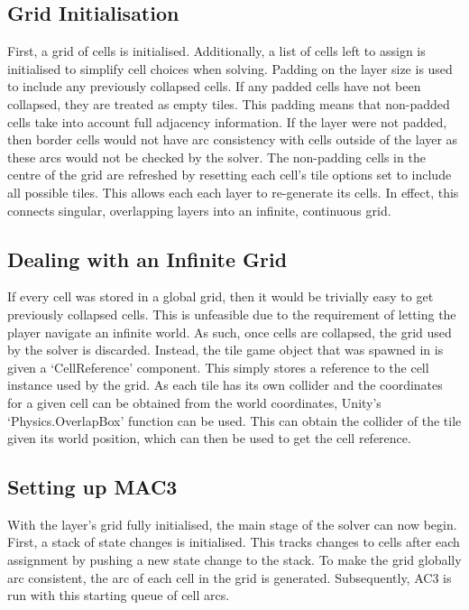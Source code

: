 \subsection{Grid Initialisation}
First, a grid of cells is initialised. Additionally, a list of cells left to assign is initialised to simplify cell choices when solving. Padding on the layer size is used to include any previously collapsed cells. If any padded cells have not been collapsed, they are treated as empty tiles. This padding means that non-padded cells take into account full adjacency information. If the layer were not padded, then border cells would not have arc consistency with cells outside of the layer as these arcs would not be checked by the solver. The non-padding cells in the centre of the grid are refreshed by resetting each cell's tile options set to include all possible tiles. This allows each each layer to re-generate its cells. In effect, this connects singular, overlapping layers into an infinite, continuous grid.%

\subsection{Dealing with an Infinite Grid}
If every cell was stored in a global grid, then it would be trivially easy to get previously collapsed cells. This is unfeasible due to the requirement of letting the player navigate an infinite world. As such, once cells are collapsed, the grid used by the solver is discarded. Instead, the tile game object that was spawned in is given a `CellReference' component. This simply stores a reference to the cell instance used by the grid. As each tile has its own collider and the coordinates for a given cell can be obtained from the world coordinates, Unity's `Physics.OverlapBox' function can be used. This can obtain the collider of the tile given its world position, which can then be used to get the cell reference.%

\subsection{Setting up MAC3}
With the layer's grid fully initialised, the main stage of the solver can now begin. First, a stack of state changes is initialised. This tracks changes to cells after each assignment by pushing a new state change to the stack. To make the grid globally arc consistent, the arc of each cell in the grid is generated. Subsequently, AC3 is run with this starting queue of cell arcs.

